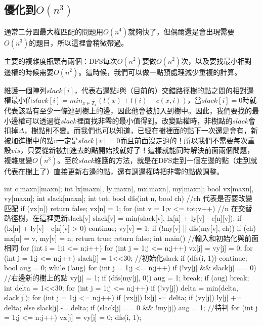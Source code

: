 \subsection{優化到$O(n^3)$}
通常二分圖最大權匹配的問題用$O(n^4)$就夠快了，但偶爾還是會出現需要$O(n^3)$的題目，所以這裡會稍微帶過。
\par 主要的複雜度瓶頸有兩個：DFS每次$O(n^2)$要做$O(n^2)$次，以及要找最小相對邊權的時候需要$O(n^2)$。這時候，我們可以做一點預處理減少重複的計算。
\par 維護一個陣列$slack[i]$，代表右邊點$i$與（目前的）交錯路徑樹的點之間的相對邊權最小值\(slack[i] = min_{x \in T_x}(l(x) + l(i) - c(x, i))\)，當$slack[i] = 0$時就代表該點有至少一條連到樹上的邊，因此他會被加入到樹中。因此，我們要找的最小邊權可以透過從\(slack\)裡面找非零的最小值得到。改變點權時，非樹點的\(slack\)會扣掉\(\Delta\)，樹點則不變。而我們也可以知道，已經在樹裡面的點下一次還是會有，新被加進樹中的點$v$一定是$slack[v] = 0$而且前面沒走過的！所以我們不需要每次重設$vis$，只要從新被加進去的點開始找就好了！這樣就能同時解決前面兩個問題，複雜度變$O(n^3)$。至於$slack$維護的方法，就是在DFS走到一個左邊的點（走到就代表在樹上了）直接更新右邊的點，還有調邊權時把非零的點做調整。
\begin{C++}
int c[maxn][maxn];
int lx[maxn], ly[maxn], mx[maxn], my[maxn];
bool vx[maxn], vy[maxn];
int slack[maxn];
int tot;
bool dfs(int n, bool ch) { //ch 代表是否要改變匹配
    if (vx[n]) return false;
    vx[n] = 1;
    for (int v = 1;v <= tot;v++) {
        //n 在交替路徑樹，在這裡更新slack[v]
        slack[v] = min(slack[v], lx[n] + ly[v] - c[n][v]);
        if (lx[n] + ly[v] - c[n][v] > 0) continue;
        vy[v] = 1;
        if (!my[v] || dfs(my[v], ch)) {
            if (ch) mx[n] = v, my[v] = n;
            return true;
        }
    }
    return false;
}
int main() {
    //輸入和初始化與前面相同
    for (int i = 1;i <= n;i++) {
        for (int j = 1;j <= n;j++) vx[j] = vy[j] = 0;
        for (int j = 1;j <= n;j++) slack[j] = 1<<30; //初始化slack
		if (dfs(i, 1)) continue;
        bool aug = 0;
        while (!aug) {
            for (int j = 1;j <= n;j++) {
                if (!vy[j] && slack[j] == 0) { //右邊新的樹上的點
					vy[j] = 1;
					if (dfs(my[j], 0)) {
						aug = 1;
						break;
					}
                }
            }
            if (aug) break;
            int delta = 1<<30;
            for (int j = 1;j <= n;j++) {
                if (!vy[j]) delta = min(delta, slack[j]);
            }
            for (int j = 1;j <= n;j++) {
                if (vx[j]) lx[j] -= delta;
                if (vy[j]) ly[j] += delta;
                else {
                    slack[j] -= delta;
                    if (slack[j] == 0 && !my[j]) aug = 1; //特判
                }
            }
        }
        for (int j = 1;j <= n;j++) vx[j] = vy[j] = 0;
        dfs(i, 1);
    }
}    


\end{C++}
